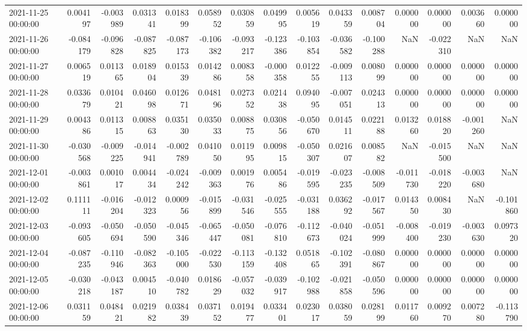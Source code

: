 \begin{tabular}{lrrrrrrrrrrrrrr}
2021-11-25 00:00:00 & 0.004197 & -0.003989 & 0.031341 & 0.018399 & 0.058952 & 0.030859 & 0.049995 & 0.005619 & 0.043359 & 0.008704 & 0.000000 & 0.000000 & 0.003660 & 0.000000 \\
2021-11-26 00:00:00 & -0.084179 & -0.096828 & -0.087825 & -0.087173 & -0.106382 & -0.093217 & -0.123386 & -0.103854 & -0.036582 & -0.100288 & NaN & -0.022310 & NaN & NaN \\
2021-11-27 00:00:00 & 0.006519 & 0.011365 & 0.018904 & 0.015339 & 0.014286 & 0.008358 & -0.000358 & 0.012255 & -0.009113 & 0.008099 & 0.000000 & 0.000000 & 0.000000 & 0.000000 \\
2021-11-28 00:00:00 & 0.033679 & 0.010421 & 0.046098 & 0.012671 & 0.048196 & 0.027352 & 0.021438 & 0.094095 & -0.007051 & 0.024313 & 0.000000 & 0.000000 & 0.000000 & 0.000000 \\
2021-11-29 00:00:00 & 0.004386 & 0.011315 & 0.008863 & 0.035130 & 0.035033 & 0.008875 & 0.030856 & -0.050670 & 0.014511 & 0.022188 & 0.013260 & 0.018820 & -0.001260 & NaN \\
2021-11-30 00:00:00 & -0.030568 & -0.009225 & -0.014941 & -0.002789 & 0.041050 & 0.011995 & 0.009815 & -0.050307 & 0.021607 & 0.008582 & NaN & -0.015500 & NaN & NaN \\
2021-12-01 00:00:00 & -0.003861 & 0.001017 & 0.004434 & -0.024242 & -0.009363 & 0.001976 & 0.005486 & -0.019595 & -0.023235 & -0.008509 & -0.011730 & -0.018220 & -0.003680 & NaN \\
2021-12-02 00:00:00 & 0.111111 & -0.016204 & -0.012323 & 0.000956 & -0.015899 & -0.031546 & -0.025555 & -0.031188 & 0.036292 & -0.017567 & 0.014350 & 0.008430 & NaN & -0.101860 \\
2021-12-03 00:00:00 & -0.093605 & -0.050694 & -0.050590 & -0.045346 & -0.065447 & -0.050081 & -0.076810 & -0.112673 & -0.040024 & -0.051999 & -0.008400 & -0.019230 & -0.003630 & 0.097320 \\
2021-12-04 00:00:00 & -0.087235 & -0.110946 & -0.082363 & -0.105000 & -0.022530 & -0.113159 & -0.132408 & 0.051865 & -0.102391 & -0.080867 & 0.000000 & 0.000000 & 0.000000 & 0.000000 \\
2021-12-05 00:00:00 & -0.030218 & -0.043187 & 0.004510 & -0.040782 & 0.018629 & -0.057032 & -0.039917 & -0.102988 & -0.021858 & -0.050596 & 0.000000 & 0.000000 & 0.000000 & 0.000000 \\
2021-12-06 00:00:00 & 0.031159 & 0.048421 & 0.021982 & 0.038439 & 0.037152 & 0.019477 & 0.033401 & 0.023017 & 0.038059 & 0.028199 & 0.011760 & 0.009270 & 0.007280 & -0.113790 \\

\end{tabular}
